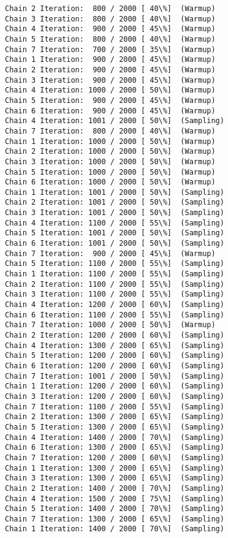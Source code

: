 \documentclass[11pt]{article}
\begin{document}
\begin{Verbatim}[commandchars=\\\{\}]
Chain 2 Iteration:  800 / 2000 [ 40\%]  (Warmup)
Chain 3 Iteration:  800 / 2000 [ 40\%]  (Warmup)
Chain 4 Iteration:  900 / 2000 [ 45\%]  (Warmup)
Chain 5 Iteration:  800 / 2000 [ 40\%]  (Warmup)
Chain 7 Iteration:  700 / 2000 [ 35\%]  (Warmup)
Chain 1 Iteration:  900 / 2000 [ 45\%]  (Warmup)
Chain 2 Iteration:  900 / 2000 [ 45\%]  (Warmup)
Chain 3 Iteration:  900 / 2000 [ 45\%]  (Warmup)
Chain 4 Iteration: 1000 / 2000 [ 50\%]  (Warmup)
Chain 5 Iteration:  900 / 2000 [ 45\%]  (Warmup)
Chain 6 Iteration:  900 / 2000 [ 45\%]  (Warmup)
Chain 4 Iteration: 1001 / 2000 [ 50\%]  (Sampling)
Chain 7 Iteration:  800 / 2000 [ 40\%]  (Warmup)
Chain 1 Iteration: 1000 / 2000 [ 50\%]  (Warmup)
Chain 2 Iteration: 1000 / 2000 [ 50\%]  (Warmup)
Chain 3 Iteration: 1000 / 2000 [ 50\%]  (Warmup)
Chain 5 Iteration: 1000 / 2000 [ 50\%]  (Warmup)
Chain 6 Iteration: 1000 / 2000 [ 50\%]  (Warmup)
Chain 1 Iteration: 1001 / 2000 [ 50\%]  (Sampling)
Chain 2 Iteration: 1001 / 2000 [ 50\%]  (Sampling)
Chain 3 Iteration: 1001 / 2000 [ 50\%]  (Sampling)
Chain 4 Iteration: 1100 / 2000 [ 55\%]  (Sampling)
Chain 5 Iteration: 1001 / 2000 [ 50\%]  (Sampling)
Chain 6 Iteration: 1001 / 2000 [ 50\%]  (Sampling)
Chain 7 Iteration:  900 / 2000 [ 45\%]  (Warmup)
Chain 5 Iteration: 1100 / 2000 [ 55\%]  (Sampling)
Chain 1 Iteration: 1100 / 2000 [ 55\%]  (Sampling)
Chain 2 Iteration: 1100 / 2000 [ 55\%]  (Sampling)
Chain 3 Iteration: 1100 / 2000 [ 55\%]  (Sampling)
Chain 4 Iteration: 1200 / 2000 [ 60\%]  (Sampling)
Chain 6 Iteration: 1100 / 2000 [ 55\%]  (Sampling)
Chain 7 Iteration: 1000 / 2000 [ 50\%]  (Warmup)
Chain 2 Iteration: 1200 / 2000 [ 60\%]  (Sampling)
Chain 4 Iteration: 1300 / 2000 [ 65\%]  (Sampling)
Chain 5 Iteration: 1200 / 2000 [ 60\%]  (Sampling)
Chain 6 Iteration: 1200 / 2000 [ 60\%]  (Sampling)
Chain 7 Iteration: 1001 / 2000 [ 50\%]  (Sampling)
Chain 1 Iteration: 1200 / 2000 [ 60\%]  (Sampling)
Chain 3 Iteration: 1200 / 2000 [ 60\%]  (Sampling)
Chain 7 Iteration: 1100 / 2000 [ 55\%]  (Sampling)
Chain 2 Iteration: 1300 / 2000 [ 65\%]  (Sampling)
Chain 5 Iteration: 1300 / 2000 [ 65\%]  (Sampling)
Chain 4 Iteration: 1400 / 2000 [ 70\%]  (Sampling)
Chain 6 Iteration: 1300 / 2000 [ 65\%]  (Sampling)
Chain 7 Iteration: 1200 / 2000 [ 60\%]  (Sampling)
Chain 1 Iteration: 1300 / 2000 [ 65\%]  (Sampling)
Chain 3 Iteration: 1300 / 2000 [ 65\%]  (Sampling)
Chain 2 Iteration: 1400 / 2000 [ 70\%]  (Sampling)
Chain 4 Iteration: 1500 / 2000 [ 75\%]  (Sampling)
Chain 5 Iteration: 1400 / 2000 [ 70\%]  (Sampling)
Chain 7 Iteration: 1300 / 2000 [ 65\%]  (Sampling)
Chain 1 Iteration: 1400 / 2000 [ 70\%]  (Sampling)

\end{Verbatim}
\end{document}
